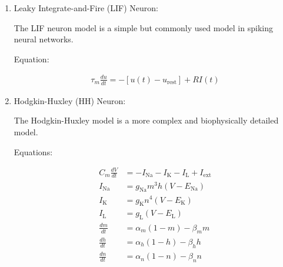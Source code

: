 \documentclass[11pt]{article}
\begin{document}
\begin{enumerate}
  \item  Leaky Integrate-and-Fire (LIF) Neuron:

        The LIF neuron model is a simple but commonly used model in spiking neural networks.


        Equation:

        \begin{align*}
          \tau_m \frac{du}{dt} = -[u(t) - u_{\text{rest}}] + RI(t)
        \end{align*}



  \item Hodgkin-Huxley (HH) Neuron:

        The Hodgkin-Huxley model is a more complex and biophysically detailed model.

        Equations:

        \begin{align*}
          C_m \frac{dV}{dt} & = -I_{\text{Na}} - I_{\text{K}} - I_{\text{L}} + I_{\text{ext}} \\
          I_{\text{Na}}     & = g_{\text{Na}} m^3 h (V - E_{\text{Na}})                       \\
          I_{\text{K}}      & = g_{\text{K}} n^4 (V - E_{\text{K}})                           \\
          I_{\text{L}}      & = g_{\text{L}} (V - E_{\text{L}})                               \\
          \frac{dm}{dt}     & = \alpha_m (1 - m) - \beta_m m                                  \\
          \frac{dh}{dt}     & = \alpha_h (1 - h) - \beta_h h                                  \\
          \frac{dn}{dt}     & = \alpha_n (1 - n) - \beta_n n                                  \\
        \end{align*}



\end{enumerate}
\end{document}
